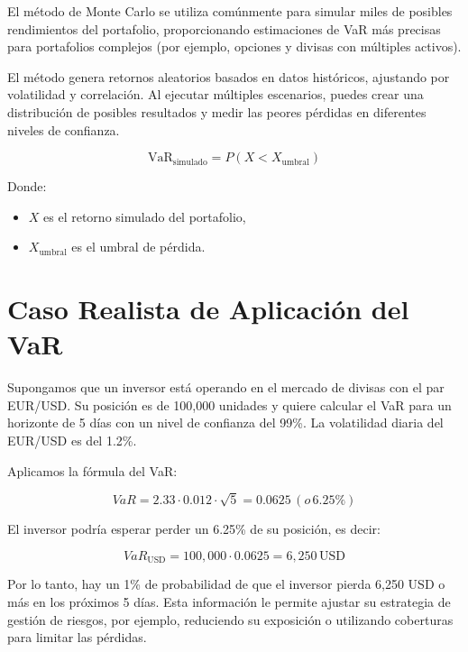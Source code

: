 \documentclass{article}
\begin{document}
El método de Monte Carlo se utiliza comúnmente para simular miles de posibles rendimientos del portafolio, proporcionando estimaciones de VaR más precisas para portafolios complejos (por ejemplo, opciones y divisas con múltiples activos).

El método genera retornos aleatorios basados en datos históricos, ajustando por volatilidad y correlación. Al ejecutar múltiples escenarios, puedes crear una distribución de posibles resultados y medir las peores pérdidas en diferentes niveles de confianza.

\[
\text{VaR}_{\text{simulado}} = P \left( X < X_{\text{umbral}} \right) 
\]

Donde:
\begin{itemize}
    \item \( X \) es el retorno simulado del portafolio,
    \item \( X_{\text{umbral}} \) es el umbral de pérdida.
\end{itemize}

\section{Caso Realista de Aplicación del VaR}

Supongamos que un inversor está operando en el mercado de divisas con el par EUR/USD. Su posición es de 100,000 unidades y quiere calcular el VaR para un horizonte de 5 días con un nivel de confianza del 99\%. La volatilidad diaria del EUR/USD es del 1.2\%.

Aplicamos la fórmula del VaR:

\[
VaR = 2.33 \cdot 0.012 \cdot \sqrt{5} = 0.0625 \, (o \, 6.25\%)
\]

El inversor podría esperar perder un 6.25\% de su posición, es decir:

\[
VaR_{\text{USD}} = 100,000 \cdot 0.0625 = 6,250 \, \text{USD}
\]

Por lo tanto, hay un 1\% de probabilidad de que el inversor pierda 6,250 USD o más en los próximos 5 días. Esta información le permite ajustar su estrategia de gestión de riesgos, por ejemplo, reduciendo su exposición o utilizando coberturas para limitar las pérdidas.
\end{document}
